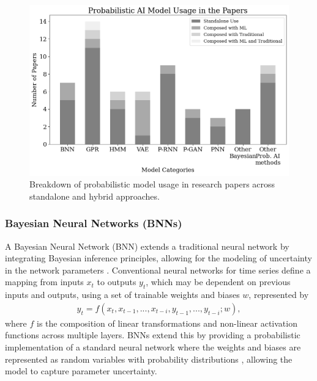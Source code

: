 \begin{figure}[H]
    \centering    \includegraphics[width=1\linewidth]{Images/model_breakdown.png}
    \caption[Breakdown of probabilistic model categories and usage in papers]{Breakdown of probabilistic model usage in research papers across standalone and hybrid approaches.}
    \label{fig:model_breakdown}
\end{figure}


\subsubsection{Bayesian Neural Networks (BNNs)}
\label{sec:bnn}

A Bayesian Neural Network (BNN) extends a traditional neural network by integrating Bayesian inference principles, allowing for the modeling of uncertainty in the network parameters \parencite{neal1995bayesian}. Conventional neural networks for time series define a mapping from inputs $x_t$ to outputs $y_t$, which may be dependent on previous inputs and outputs, using a set of trainable weights and biases $w$, represented by
\begin{equation}
    \begin{gathered}
        y_t = f(x_t, x_{t-1}, ..., x_{t-i},  y_{t-1}, ..., y_{t-i};w),
    \end{gathered}
\end{equation}
where $f$ is the composition of linear transformations and non-linear activation functions across multiple layers. BNNs extend this by providing a probabilistic implementation of a standard neural network where the weights and biases are represented as random variables with probability distributions \parencite{chandra2023bayesian}, allowing the model to capture parameter uncertainty. 

